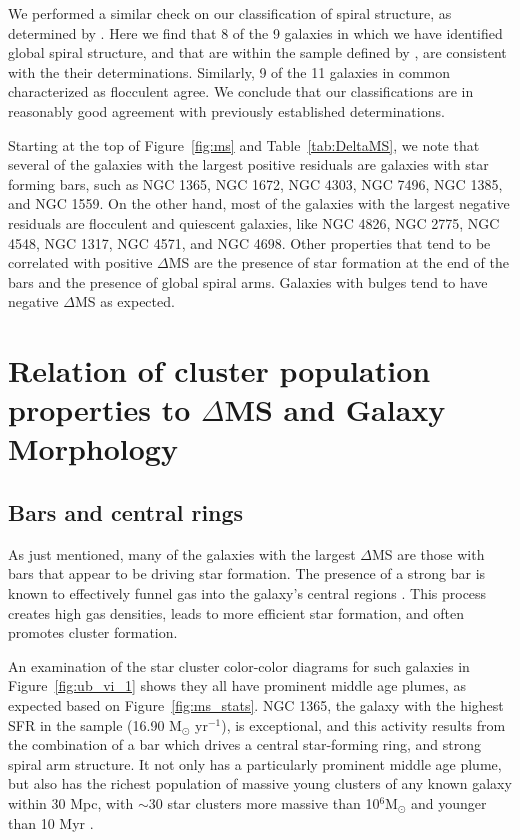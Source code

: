 \documentclass[linenumbers]{aastex63}
\begin{document}
We performed a similar check on our classification of spiral structure, as determined by \citet{EE87}. Here we find that 8 of the 9 galaxies in which we have identified global spiral structure, and that are within the sample defined by \citet{EE87}, are consistent with the their determinations. Similarly, 9 of the 11 galaxies in common characterized as flocculent agree. We conclude that our classifications are in reasonably good agreement with previously established determinations.

Starting at the top of Figure~\ref{fig:ms} and Table~\ref{tab:DeltaMS}, we note that several of the galaxies with the largest positive residuals are galaxies with star forming bars, such as NGC 1365, NGC 1672, NGC 4303, NGC 7496, NGC 1385, and NGC 1559. On the other hand, most of the galaxies with the largest negative residuals are flocculent and quiescent galaxies, like NGC 4826, NGC 2775, NGC 4548, NGC 1317, NGC 4571, and NGC 4698.    
Other properties that tend to be correlated with positive $\Delta$MS are the presence of star formation at the end of the bars and the presence of global spiral arms. Galaxies with bulges tend to have negative $\Delta$MS as expected.

\section{Relation of cluster population properties to $\Delta$MS and Galaxy Morphology} \label{sect:deltams}

\subsection{Bars and central rings}

 As just mentioned, many of the galaxies with the largest $\Delta$MS are those with bars that appear to be driving star formation.  
 The presence of a strong bar is known to effectively funnel gas into the galaxy's central regions \citep[e.g.][]{athanassoula_existence_1992,sellwood_dynamics_1993,kuno_nobeyama_2007, sormani_fuelling_2023, schinnerer_phangs-jwst_2023}.  This process creates high gas densities, leads to more efficient star formation, and often promotes cluster formation. 

An examination of the star cluster color-color diagrams for such galaxies in Figure~\ref{fig:ub_vi_1} shows they all have prominent middle age plumes, as expected based on Figure~\ref{fig:ms_stats}. NGC 1365, the galaxy with the highest SFR in the sample (16.90 M$_{\odot}$ yr$^{-1}$), is exceptional, and this activity results from the combination of a bar which drives a central star-forming ring, and strong spiral arm structure.
 It not only has a particularly prominent middle age plume, but also has the richest population of massive young clusters of any known galaxy within 30 Mpc, with $\sim$30 star clusters more massive than 10$^6$M$_{\odot}$ and younger than 10 Myr \citep{whitmore_phangs-jwst_2023}.
 
\end{document}
